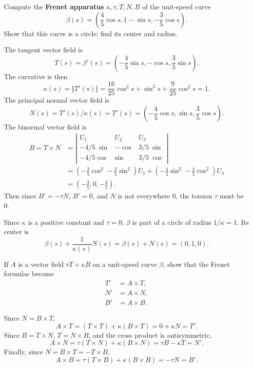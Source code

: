 \documentclass[10pt]{report}
\begin{document}
\begin{exer}[2.3: 1]
	Compute the \textbf{Frenet apparatus} $\kappa, \tau, T, N, B$ of the unit-speed curve
	\[
		\beta(s) = \left( \frac{4}{5} \cos s, 1-\sin s, -\frac{3}{5} \cos s \right).
	\] Show that this curve is a circle; find its center and radius.
\end{exer}
The tangent vector field is
\[
	T(s) = \beta'(s) = \left( -\frac{4}{5} \sin s, -\cos s, \frac{3}{5} \sin s \right).
\] The curvative is then
\[
	\kappa(s) = \Vert{T'(s)}\Vert = \frac{16}{25} \cos^2 s + \sin^2 s + \frac{9}{25} \cos^2 s = 1.
\] The principal normal vector field is
\[
	N(s) = T'(s) / \kappa(s) = T'(s) = \left( -\frac{4}{5} \cos s, \sin s, \frac{3}{5} \cos s \right).
\] The binormal vector field is
\begin{align*}
	B = T \times N &= \left| 
	\begin{matrix}
		U_1 & U_2 & U_3 \\
		-4/5\;\sin & -\cos & 3/5\;\sin \\
		-4/5\cos & \sin & 3/5\;\cos
	\end{matrix}\right| \\
		       &= \left( -\frac{3}{5} \cos^2 - \frac{3}{5} \sin^2 \right)U_1 + \left( -\frac{4}{5} \sin^2 - \frac{4}{5} \cos^2 \right)U_3 \\
		       &= \left( -\frac{3}{5}, 0, -\frac{4}{5} \right).
\end{align*}
Then since $B' = -\tau N$, $B' = 0$, and $N$ is not everywhere 0, the torsion $\tau$ must be 0.

Since $\kappa$ is a positive constant and $\tau=0$, $\beta$ is part of a circle of radius $1/\kappa = 1$. Its center is
\[
	\beta(s) + \frac{1}{\kappa(s)} N(s) = \beta(s) + N(s) = (0, 1, 0).
\] 

\begin{exer}[2.3: 5]
	If $A$ is a vector field $\tau T+\kappa B$ on a unit-speed curve $\beta$, show that the Frenet formulas become
	\begin{align*}
		T' &= A \times T, \\
		N' &= A \times N, \\
		B' &= A \times B.
	\end{align*}
\end{exer}
Since $N=B\times T$,
\[
	A \times T = (T \times T) + \kappa(B \times T) = 0 + \kappa N = T'.
\] 
Since $B=T \times N$, $T = N \times B$, and the cross product is antisymmetric,
\[
	A \times N = \tau(T \times N) + \kappa(B\times N) = \tau B - \kappa T = N'.
\] 
Finally, since $N = B \times T = - T \times B$,
\[
	A \times B = \tau (T \times B) + \kappa(B \times B) = -\tau N = B'.
\] 
\end{document}
